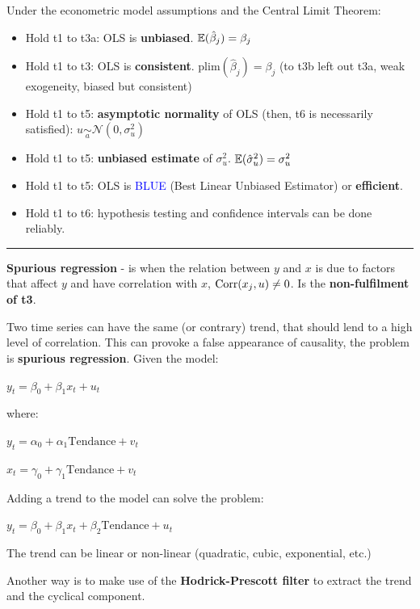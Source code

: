 \begin{f}
	
Under the econometric model assumptions and the Central Limit Theorem:

\begin{itemize}[leftmargin=*]
	\item Hold t1 to t3a: OLS is \textbf{unbiased}. \(\mathbb{E}(\hat{\beta}_{j}) = \beta_{j}\)
	\item Hold t1 to t3: OLS is \textbf{consistent}. \(\mathrm{plim}(\hat{\beta}_{j}) = \beta_{j}\) (to t3b left out t3a, weak exogeneity, biased but consistent)
	\item Hold t1 to t5: \textbf{asymptotic normality} of OLS (then, t6 is necessarily satisfied): \(u \underset{a}{\sim}\mathcal{N}(0, \sigma^{2}_{u})\)
	\item Hold t1 to t5: \textbf{unbiased estimate} of \(\sigma^{2}_{u}\). \(\mathbb{E}(\hat{\sigma}^{2}_{u}) = \sigma^{2}_{u}\)
	\item Hold t1 to t5: OLS is \textcolor{blue}{BLUE} (Best Linear Unbiased Estimator) or \textbf{efficient}.
	\item Hold t1 to t6: hypothesis testing and confidence intervals can be done reliably.
\end{itemize}


\end{f}  \hrule

\begin{f}

\textbf{Spurious regression} - is when the relation between \(y\) and \(x\) is due to factors that affect \(y\) and have correlation with \(x\), \(\mathrm{Corr}(x_{j}, u) \neq 0\). Is the \textbf {non-fulfilment of t3}.



Two time series can have the same (or contrary) trend, that should lend to a high level of correlation. This can provoke a false appearance of causality, the problem is \textbf{spurious regression}. Given the model:
%
\begin{center}
	\(y_{t} = \beta_{0} + \beta_{1} x_{t} + u_{t}\)
\end{center}
where:
\begin{center}
	\(y_{t} = \alpha_{0} + \alpha_{1} \mathrm{Tendance} + v_{t}\)
	
	\(x_{t} = \gamma_{0} + \gamma_{1} \mathrm{Tendance} + v_{t}\)
\end{center}
Adding a trend to the model can solve the problem:
\begin{center}
	\(y_{t} = \beta_{0} + \beta_{1} x_{t} + \beta_{2} \mathrm{Tendance} + u_{t}\)
\end{center}
The trend can be linear or non-linear (quadratic, cubic, exponential, etc.)

Another way is to make use of the \textbf{Hodrick-Prescott filter} to extract the trend and the cyclical component.

\end{f}    

